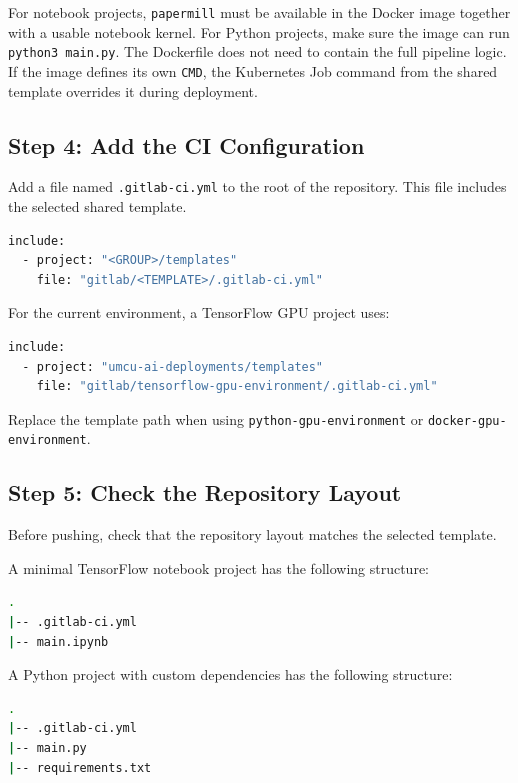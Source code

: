 \documentclass{article}
\begin{document}
For notebook projects, \texttt{papermill} must be available in the Docker image together with a usable notebook kernel. For Python projects, make sure the image can run \texttt{python3 main.py}. The Dockerfile does not need to contain the full pipeline logic. If the image defines its own \texttt{CMD}, the Kubernetes Job command from the shared template overrides it during deployment.

\subsection{Step 4: Add the CI Configuration}

Add a file named \texttt{.gitlab-ci.yml} to the root of the repository. This file includes the selected shared template.

\begin{lstlisting}[language=sh]
include:
  - project: "<GROUP>/templates"
    file: "gitlab/<TEMPLATE>/.gitlab-ci.yml"
\end{lstlisting}

For the current environment, a TensorFlow GPU project uses:

\begin{lstlisting}[language=sh]
include:
  - project: "umcu-ai-deployments/templates"
    file: "gitlab/tensorflow-gpu-environment/.gitlab-ci.yml"
\end{lstlisting}

Replace the template path when using \texttt{python-gpu-environment} or \texttt{docker-gpu-environment}.

\subsection{Step 5: Check the Repository Layout}

Before pushing, check that the repository layout matches the selected template.

\vspace{0.5cm}

A minimal TensorFlow notebook project has the following structure:

\begin{lstlisting}[language=sh]
.
|-- .gitlab-ci.yml
|-- main.ipynb
\end{lstlisting}

A Python project with custom dependencies has the following structure:

\begin{lstlisting}[language=sh]
.
|-- .gitlab-ci.yml
|-- main.py
|-- requirements.txt
\end{lstlisting}
\end{document}
